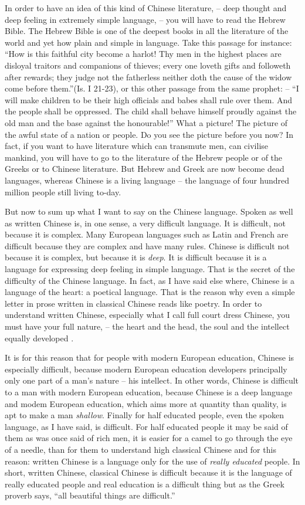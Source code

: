 In order to have an idea of this kind of Chinese literature,
-- deep thought and deep feeling in extremely simple language,
-- you will have to read the Hebrew Bible.
The Hebrew Bible is one of the deepest books in all the literature of the world and yet how plain and simple in language.
Take this passage for instance:
``How is this faithful city become a harlot!
Thy men in the highest places are disloyal traitors and companions of thieves;
every one loveth gifts and followeth after rewards;
they judge not the fatherless neither doth the cause of the widow come before them.''(Is. I 21-23),
or this other passage from the same prophet: --
``I will make children to be their high officials and babes shall rule over them.
And the people shall be oppressed.
The child shall behave himself proudly against the old man and the base against the honourable!''
What a picture! The picture of the awful state of a nation or people.
Do you see the picture before you now?
In fact, if you want to have literature which can transmute men, can civilise mankind,
you will have to go to the literature of the Hebrew people or of the Greeks or to Chinese literature.
But Hebrew and Greek are now become dead languages,
whereas Chinese is a living language
-- the language of four hundred million people still living to-day.

But now to sum up what I want to say on the Chinese language.
Spoken as well as written Chinese is, in one sense,
a very difficult language.
It is difficult, not because it is complex.
Many European languages such as Latin and French are difficult because they are complex and have many rules.
Chinese is difficult not because it is complex, but because it is \emph{deep}.
It is difficult because it is a language for expressing deep feeling in simple language.
That is the secret of the difficulty of the Chinese language.
In fact, as I have said else where, Chinese is a language of the heart: a poetical language.
That is the reason why even a simple letter in prose written in classical Chinese reads like poetry.
In order to understand written Chinese,
especially what I call full court dress Chinese, you must have your full nature,
-- the heart and the head, the soul and the intellect equally developed .

It is for this reason that for people with modern European education,
Chinese is especially difficult,
because modern European education developers principally only one part of a man's nature -- his intellect.
In other words, Chinese is difficult to a man with modern European education,
because Chinese is a deep language and modem European education,
which aims more at quantity than quality, is apt to make a man \emph{shallow}.
Finally for half educated people, even the spoken language, as I have said, is difficult.
For half educated people it may be said of them as was once said of rich men,
it is easier for a camel to go through the eye of a needle,
than for them to understand high classical Chinese and for this reason:
written Chinese is a language only for the use of \emph{really educated} people.
In short, written Chinese, classical Chinese is difficult because it is the language of really educated people and real education is a difficult thing but as the Greek proverb says, ``all beautiful things are difficult.''

